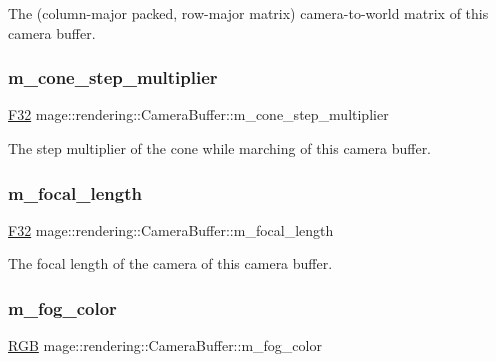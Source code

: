 The (column-\/major packed, row-\/major matrix) camera-\/to-\/world matrix of this camera buffer. \hypertarget{structmage_1_1rendering_1_1_camera_buffer_a802e8c4ba601b91658cb30c2f1c2cfe2}{}\label{structmage_1_1rendering_1_1_camera_buffer_a802e8c4ba601b91658cb30c2f1c2cfe2} 
\subsubsection{\texorpdfstring{m\+\_\+cone\+\_\+step\+\_\+multiplier}{m\_cone\_step\_multiplier}}
{\footnotesize\ttfamily \hyperlink{namespacemage_aa97e833b45f06d60a0a9c4fc22ae02c0}{F32} mage\+::rendering\+::\+Camera\+Buffer\+::m\+\_\+cone\+\_\+step\+\_\+multiplier}

The step multiplier of the cone while marching of this camera buffer. \hypertarget{structmage_1_1rendering_1_1_camera_buffer_a7ed5079582d476597f8bc4d6a0b3f372}{}\label{structmage_1_1rendering_1_1_camera_buffer_a7ed5079582d476597f8bc4d6a0b3f372} 
\subsubsection{\texorpdfstring{m\+\_\+focal\+\_\+length}{m\_focal\_length}}
{\footnotesize\ttfamily \hyperlink{namespacemage_aa97e833b45f06d60a0a9c4fc22ae02c0}{F32} mage\+::rendering\+::\+Camera\+Buffer\+::m\+\_\+focal\+\_\+length}

The focal length of the camera of this camera buffer. \hypertarget{structmage_1_1rendering_1_1_camera_buffer_a6f963e7d607c59ab0dfc3972e06a9739}{}\label{structmage_1_1rendering_1_1_camera_buffer_a6f963e7d607c59ab0dfc3972e06a9739} 
\subsubsection{\texorpdfstring{m\+\_\+fog\+\_\+color}{m\_fog\_color}}
{\footnotesize\ttfamily \hyperlink{structmage_1_1_r_g_b}{R\+GB} mage\+::rendering\+::\+Camera\+Buffer\+::m\+\_\+fog\+\_\+color}

